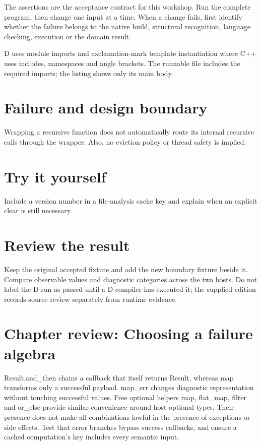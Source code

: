 The assertions are the acceptance contract for this workshop. Run the complete program, then change one input at a time. When a change fails, first identify whether the failure belongs to the native build, structural recognition, language checking, execution or the domain result.

\clearpage
{}
D uses module imports and exclamation-mark template instantiation where C++ uses includes, namespaces and angle brackets. The runnable file includes the required imports; the listing shows only its main body.


\section*{Failure and design boundary}
Wrapping a recursive function does not automatically route its internal recursive calls through the wrapper. Also, no eviction policy or thread safety is implied.

\section*{Try it yourself}
Include a version number in a file-analysis cache key and explain when an explicit clear is still necessary.

\section*{Review the result}
Keep the original accepted fixture and add the new boundary fixture beside it. Compare observable values and diagnostic categories across the two hosts. Do not label the D run as passed until a D compiler has executed it; the supplied edition records source review separately from runtime evidence.

\clearpage
\section*{Chapter review: Choosing a failure algebra}
Result.and\_then chains a callback that itself returns Result, whereas map transforms only a successful payload. map\_err changes diagnostic representation without touching successful values. Free optional helpers map, flat\_map, filter and or\_else provide similar convenience around host optional types. Their presence does not make all combinations lawful in the presence of exceptions or side effects. Test that error branches bypass success callbacks, and ensure a cached computation's key includes every semantic input.

